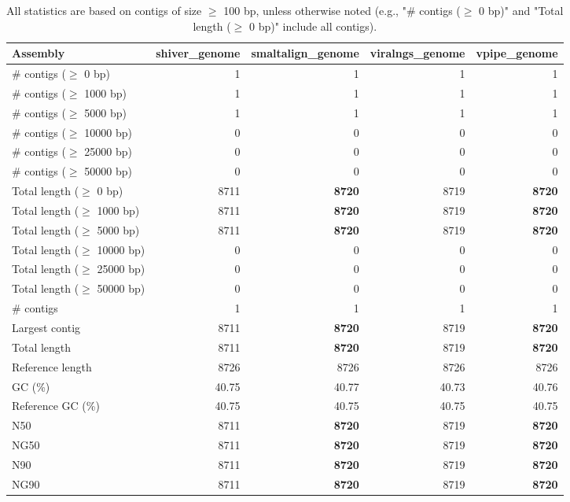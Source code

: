 \documentclass[12pt,a4paper]{article}
\begin{document}
\begin{table}[ht]
\begin{center}
\caption{All statistics are based on contigs of size $\geq$ 100 bp, unless otherwise noted (e.g., "\# contigs ($\geq$ 0 bp)" and "Total length ($\geq$ 0 bp)" include all contigs).}
\begin{tabular}{|l*{4}{|r}|}
\hline
Assembly & shiver\_genome & smaltalign\_genome & viralngs\_genome & vpipe\_genome \\ \hline
\# contigs ($\geq$ 0 bp) & 1 & 1 & 1 & 1 \\ \hline
\# contigs ($\geq$ 1000 bp) & 1 & 1 & 1 & 1 \\ \hline
\# contigs ($\geq$ 5000 bp) & 1 & 1 & 1 & 1 \\ \hline
\# contigs ($\geq$ 10000 bp) & 0 & 0 & 0 & 0 \\ \hline
\# contigs ($\geq$ 25000 bp) & 0 & 0 & 0 & 0 \\ \hline
\# contigs ($\geq$ 50000 bp) & 0 & 0 & 0 & 0 \\ \hline
Total length ($\geq$ 0 bp) & 8711 & {\bf 8720} & 8719 & {\bf 8720} \\ \hline
Total length ($\geq$ 1000 bp) & 8711 & {\bf 8720} & 8719 & {\bf 8720} \\ \hline
Total length ($\geq$ 5000 bp) & 8711 & {\bf 8720} & 8719 & {\bf 8720} \\ \hline
Total length ($\geq$ 10000 bp) & 0 & 0 & 0 & 0 \\ \hline
Total length ($\geq$ 25000 bp) & 0 & 0 & 0 & 0 \\ \hline
Total length ($\geq$ 50000 bp) & 0 & 0 & 0 & 0 \\ \hline
\# contigs & 1 & 1 & 1 & 1 \\ \hline
Largest contig & 8711 & {\bf 8720} & 8719 & {\bf 8720} \\ \hline
Total length & 8711 & {\bf 8720} & 8719 & {\bf 8720} \\ \hline
Reference length & 8726 & 8726 & 8726 & 8726 \\ \hline
GC (\%) & 40.75 & 40.77 & 40.73 & 40.76 \\ \hline
Reference GC (\%) & 40.75 & 40.75 & 40.75 & 40.75 \\ \hline
N50 & 8711 & {\bf 8720} & 8719 & {\bf 8720} \\ \hline
NG50 & 8711 & {\bf 8720} & 8719 & {\bf 8720} \\ \hline
N90 & 8711 & {\bf 8720} & 8719 & {\bf 8720} \\ \hline
NG90 & 8711 & {\bf 8720} & 8719 & {\bf 8720} \\ \hline

\end{tabular}
\end{center}
\end{table}
\end{document}
